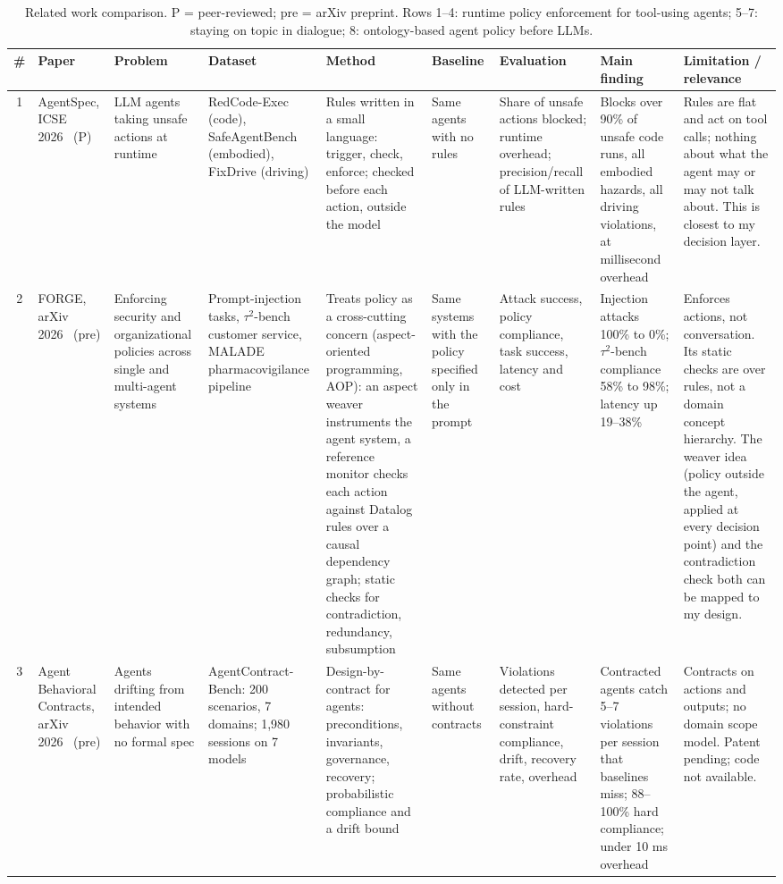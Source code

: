 \documentclass[conference]{IEEEtran}
\begin{document}
\begin{table}[t]
\centering
\scriptsize
\setlength{\tabcolsep}{4pt}
\renewcommand{\arraystretch}{1.15}
\caption{Related work comparison. P = peer-reviewed; pre = arXiv preprint. Rows 1--4: runtime policy enforcement for tool-using agents; 5--7: staying on topic in dialogue; 8: ontology-based agent policy before LLMs.}
\label{tab:related}
\begin{tabular}{@{}c >{\RaggedRight}p{1.9cm} >{\RaggedRight}p{1.8cm} >{\RaggedRight}p{1.8cm} >{\RaggedRight}p{2.2cm} >{\RaggedRight}p{1.6cm} >{\RaggedRight}p{1.8cm} >{\RaggedRight}p{2.0cm} >{\RaggedRight}p{2.5cm}@{}}
\toprule
\# & Paper & Problem & Dataset & Method & Baseline & Evaluation & Main finding & Limitation / relevance \\
\midrule
1 & AgentSpec, ICSE 2026~\cite{agentspec} (P) & LLM agents taking unsafe actions at runtime & RedCode-Exec (code), SafeAgentBench (embodied), FixDrive (driving) & Rules written in a small language: trigger, check, enforce; checked before each action, outside the model & Same agents with no rules & Share of unsafe actions blocked; runtime overhead; precision/recall of LLM-written rules & Blocks over 90\% of unsafe code runs, all embodied hazards, all driving violations, at millisecond overhead & Rules are flat and act on tool calls; nothing about what the agent may or may not talk about. This is closest to my decision layer. \\
2 & FORGE, arXiv 2026~\cite{forge} (pre) & Enforcing security and organizational policies across single and multi-agent systems & Prompt-injection tasks, $\tau^2$-bench customer service, MALADE pharmacovigilance pipeline & Treats policy as a cross-cutting concern (aspect-oriented programming, AOP): an aspect weaver instruments the agent system, a reference monitor checks each action against Datalog rules over a causal dependency graph; static checks for contradiction, redundancy, subsumption & Same systems with the policy specified only in the prompt & Attack success, policy compliance, task success, latency and cost & Injection attacks 100\% to 0\%; $\tau^2$-bench compliance 58\% to 98\%; latency up 19--38\% & Enforces actions, not conversation. Its static checks are over rules, not a domain concept hierarchy. The weaver idea (policy outside the agent, applied at every decision point) and the contradiction check both can be mapped to my design. \\
3 & Agent Behavioral Contracts, arXiv 2026~\cite{abc} (pre) & Agents drifting from intended behavior with no formal spec & Agent\-Contract-Bench: 200 scenarios, 7 domains; 1,980 sessions on 7 models & Design-by-contract for agents: preconditions, invariants, governance, recovery; probabilistic compliance and a drift bound & Same agents without contracts & Violations detected per session, hard-constraint compliance, drift, recovery rate, overhead & Contracted agents catch 5--7 violations per session that baselines miss; 88--100\% hard compliance; under 10 ms overhead & Contracts on actions and outputs; no domain scope model. Patent pending; code not available. \\

\end{tabular}
\end{table}
\end{document}
